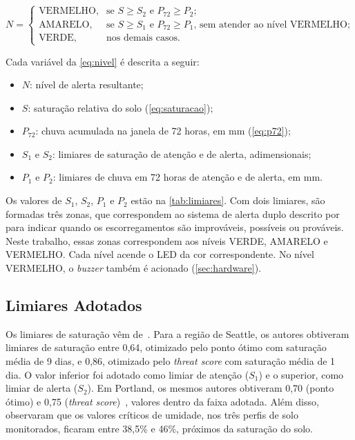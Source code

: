 \begin{equation}
\label{eq:nivel}
N =
\begin{cases}
\text{VERMELHO}, & \text{se } S \geq S_2 \text{ e } P_{72} \geq P_2;\\[2pt]
\text{AMARELO},  & \text{se } S \geq S_1 \text{ e } P_{72} \geq P_1
                   \text{, sem atender ao nível VERMELHO;}\\[2pt]
\text{VERDE},    & \text{nos demais casos.}
\end{cases}
\end{equation}

Cada variável da \autoref{eq:nivel} é descrita a seguir:

\begin{itemize}
  \item $N$: nível de alerta resultante;
  \item $S$: saturação relativa do solo (\autoref{eq:saturacao});
  \item $P_{72}$: chuva acumulada na janela de 72 horas, em mm
        (\autoref{eq:p72});
  \item $S_1$ e $S_2$: limiares de saturação de atenção e de alerta,
        adimensionais;
  \item $P_1$ e $P_2$: limiares de chuva em 72 horas de atenção e de
        alerta, em mm.
\end{itemize}

Os valores de $S_1$, $S_2$, $P_1$ e $P_2$ estão na
\autoref{tab:limiares}. Com dois limiares, são formadas três zonas, que
correspondem ao sistema de alerta duplo descrito por~ para indicar quando os
escorregamentos são improváveis, possíveis ou prováveis. Neste
trabalho, essas zonas correspondem aos níveis VERDE, AMARELO e
VERMELHO.
Cada nível acende o LED da cor correspondente. No nível VERMELHO, o
\textit{buzzer} também é acionado (\autoref{sec:hardware}).

\subsection{Limiares Adotados}
\label{subsec:limiares}

Os limiares de saturação vêm de~. Para a região de
Seattle, os autores obtiveram limiares de saturação entre 0,64,
otimizado pelo ponto ótimo com saturação média de 9 dias, e 0,86,
otimizado pelo \textit{threat score} com saturação média de 1 dia. O
valor inferior foi adotado como limiar de atenção ($S_1$) e o
superior, como limiar de alerta ($S_2$).
Em Portland, os mesmos autores obtiveram 0,70 (ponto ótimo) e 0,75
(\textit{threat score})~\cite[p.~11, Tabela~2]{mirus2018developing},
valores dentro da faixa adotada. Além disso,~ observaram que os valores
críticos de umidade, nos três perfis de solo monitorados, ficaram
entre 38,5\% e 46\%, próximos da saturação do solo.

